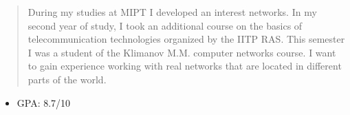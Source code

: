 \documentclass[10pt,a4paper,ragged2e,withhyper]{altacv}
\begin{document}
\begin{paracol}{2}
        \newpage
        
        \switchcolumn
        
            \begin{quote}
                During my studies at MIPT I developed an interest networks. In my second year of study, I took an additional course on the basics of telecommunication technologies organized by the IITP RAS. This semester I was a student of the Klimanov M.M. computer networks course. I want to gain experience working with real networks that are located in different parts of the world.
            \end{quote}
        
            
        
            \begin{itemize}
                \item GPA: 8.7/10
            \end{itemize}
            \divider
            

\end{paracol}
\end{document}

